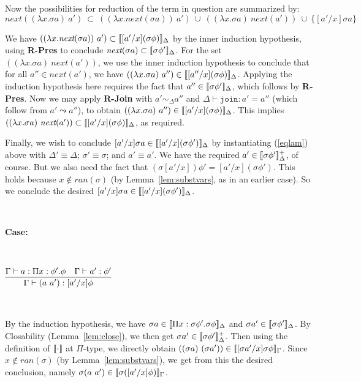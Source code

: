 \documentclass[copyright]{eptcs}
\newcommand{\next}[0]{\textit{next}}
\newcommand{\join}[0]{\texttt{join}}
\newcommand{\interp}[1]{[\negthinspace[#1]\negthinspace]}
\begin{document}
Now the possibilities for reduction of the term in question are
summarized by:
\[
\next((\lambda x. \sigma a)\ a') \ \subset\ 
((\lambda x. \next(\sigma a))\ a')\ \cup \ 
((\lambda x. \sigma a)\ \next(a'))\ \cup \ 
\{ [a'/x]\sigma a \}
\]

\noindent We have $((\lambda x.\next(\sigma
a))\ a')\subset\interp{[a'/x](\sigma\phi)}_\Delta$ by the inner
induction hypothesis, using \textbf{R-Pres} to conclude $\next(\sigma
a)\subset\interp{\sigma\phi'}_{\Delta}$.  For the set $((\lambda
x. \sigma a)\ \next(a'))$, we use the inner induction hypothesis to
conclude that for all $a''\in\next(a')$, we have $((\lambda x. \sigma
a)\ a'')\in\interp{[a''/x](\sigma \phi)}_{\Delta}$.  Applying the
induction hypothesis here requires the fact that
$a''\in\interp{\sigma\phi'}_\Delta$, which follows by \textbf{R-Pres}.
Now we may apply \textbf{R-Join} with $a' \sim_\Delta a''$ and
$\Delta\vdash\join:a' = a''$ (which follow from $a'\leadsto a''$), to
obtain $((\lambda x. \sigma a)\ a'')\in\interp{[a'/x](\sigma
  \phi)}_{\Delta}$.  This implies $((\lambda x. \sigma
a)\ \next(a'))\subset\interp{[a'/x](\sigma \phi)}_{\Delta}$, as
required.

Finally, we wish to conclude $[a'/x]\sigma a\in\interp{[a'/x](\sigma
  \phi')}_{\Delta}$ by instantiating (\ref{eqlam}) above with
$\Delta'\equiv \Delta$; $\sigma'\equiv\sigma$; and $a'\equiv a'$. We
have the required $a'\in\interp{\sigma\phi'}^+_\Delta$, of course.
But we also need the fact that $(\sigma[a'/x]) \phi' = [a'/x](\sigma
\phi')$.  This holds because $x\not\in\textit{ran}(\sigma)$ (by
Lemma~\ref{lem:substvars}, as in an earlier case).  So we conclude the
desired $[a'/x]\sigma a\in\interp{[a'/x](\sigma \phi')}_{\Delta}$.

\ 

\noindent \textbf{Case:}

\

$\infer{\Gamma \vdash (a\ a') : [a'/x]\phi}{\Gamma \vdash a:\Pi x:\phi'.\phi & \Gamma\vdash a':\phi'}$

\ 

\noindent By the induction hypothesis, we have $\sigma a\in\interp{\Pi
  x:\sigma\phi'.\sigma\phi}_\Delta$ and $\sigma
a'\in\interp{\sigma\phi'}_\Delta$.  By Closability
(Lemma~\ref{lem:close}), we then get $\sigma
a'\in\interp{\sigma\phi'}^+_\Delta$.  Then using the definition of
$\interp{\cdot}$ at $\Pi$-type, we directly obtain $((\sigma
a)\ (\sigma a'))\in\interp{[\sigma a'/x]\sigma\phi}_\Gamma$.  Since
$x\not\in\textit{ran}(\sigma)$ (by Lemma~\ref{lem:substvars}), we get
from this the desired conclusion, namely $\sigma
(a\ a')\in\interp{\sigma([a'/x]\phi)}_\Gamma$.
\end{document}
